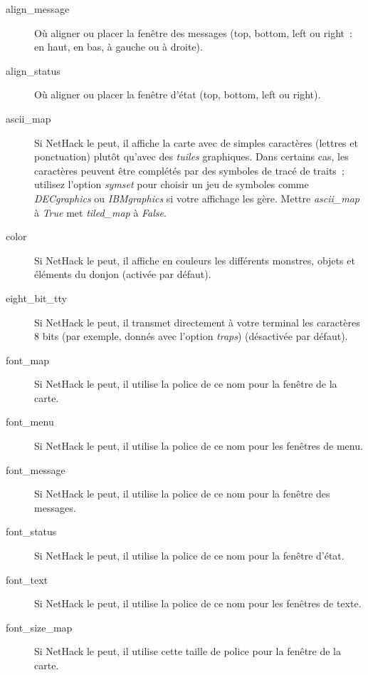 \documentclass[titlepage]{article}
\begin{document}
\begin{description}
\item[{align\_message}]
Où aligner ou placer la fenêtre des messages (top, bottom, left ou right~:
en haut, en bas, à gauche ou à droite).

\item[{align\_status}]
Où aligner ou placer la fenêtre d'état (top, bottom, left ou right).

\item[{ascii\_map}]
Si NetHack le peut, il affiche la carte avec de simples caractères (lettres
et ponctuation) plutôt qu'avec des \textit{tuiles} graphiques.
Dans certains cas, les caractères peuvent être complétés par des symboles
de tracé de traits~; utilisez l'option
\textit{symset}
pour choisir un jeu de symboles comme \textit{DECgraphics} ou
\textit{IBMgraphics} si votre affichage les gère.
Mettre
\textit{ascii\_map}
à \textit{True} met
\textit{tiled\_map}
à \textit{False}.

\item[{color}]
Si NetHack le peut, il affiche en couleurs les différents monstres, objets
et éléments du donjon (activée par défaut).

\item[{eight\_bit\_tty}]
Si NetHack le peut, il transmet directement à votre terminal les
caractères 8 bits (par exemple, donnés avec l'option
\textit{traps})
(désactivée par défaut).

\item[{font\_map}]
Si NetHack le peut, il utilise la police de ce nom pour la fenêtre de la
carte.

\item[{font\_menu}]
Si NetHack le peut, il utilise la police de ce nom pour les fenêtres de
menu.

\item[{font\_message}]
Si NetHack le peut, il utilise la police de ce nom pour la fenêtre des
messages.

\item[{font\_status}]
Si NetHack le peut, il utilise la police de ce nom pour la fenêtre d'état.

\item[{font\_text}]
Si NetHack le peut, il utilise la police de ce nom pour les fenêtres de
texte.

\item[{font\_size\_map}]
Si NetHack le peut, il utilise cette taille de police pour la fenêtre de
la carte.


\end{description}
\end{document}
